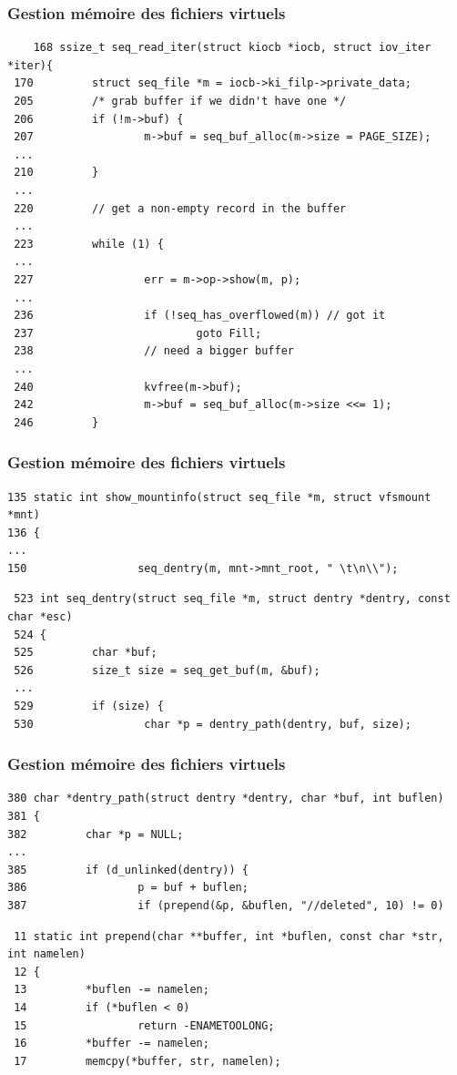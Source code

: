 \documentclass{beamer}
\begin{document}
\begin{frame}[fragile]
    \frametitle{Gestion mémoire des fichiers virtuels}
    
    \begin{verbatim}
    168 ssize_t seq_read_iter(struct kiocb *iocb, struct iov_iter *iter){
 170         struct seq_file *m = iocb->ki_filp->private_data;
 205         /* grab buffer if we didn't have one */
 206         if (!m->buf) {
 207                 m->buf = seq_buf_alloc(m->size = PAGE_SIZE);
 ...
 210         }
 ...
 220         // get a non-empty record in the buffer
 ...
 223         while (1) {
 ...
 227                 err = m->op->show(m, p);
 ...
 236                 if (!seq_has_overflowed(m)) // got it
 237                         goto Fill;
 238                 // need a bigger buffer
 ...
 240                 kvfree(m->buf);
 242                 m->buf = seq_buf_alloc(m->size <<= 1);
 246         }
    \end{verbatim}
\end{frame}

\begin{frame}[fragile]
    \frametitle{Gestion mémoire des fichiers virtuels}
    
    \begin{verbatim}
135 static int show_mountinfo(struct seq_file *m, struct vfsmount *mnt)
136 {
...
150                 seq_dentry(m, mnt->mnt_root, " \t\n\\");
    \end{verbatim}
    \begin{verbatim}
 523 int seq_dentry(struct seq_file *m, struct dentry *dentry, const char *esc)
 524 {
 525         char *buf;
 526         size_t size = seq_get_buf(m, &buf);
 ...
 529         if (size) {
 530                 char *p = dentry_path(dentry, buf, size);
    \end{verbatim}
\end{frame}


\begin{frame}[fragile]
    \frametitle{Gestion mémoire des fichiers virtuels}
    \begin{verbatim}
380 char *dentry_path(struct dentry *dentry, char *buf, int buflen)
381 {
382         char *p = NULL;
...
385         if (d_unlinked(dentry)) {
386                 p = buf + buflen;
387                 if (prepend(&p, &buflen, "//deleted", 10) != 0)
    \end{verbatim}
    \begin{verbatim}
 11 static int prepend(char **buffer, int *buflen, const char *str, int namelen)
 12 {
 13         *buflen -= namelen;
 14         if (*buflen < 0)
 15                 return -ENAMETOOLONG;
 16         *buffer -= namelen;
 17         memcpy(*buffer, str, namelen);
    \end{verbatim}
\end{frame}
\end{document}
